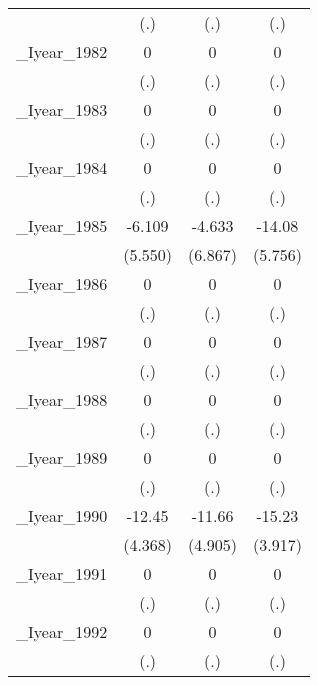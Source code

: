 \begin{table}[htbp]
\begin{tabular}{l*{3}{c}}
          &      (.)         &      (.)         &      (.)         \\
[1em]
\_Iyear\_1982&        0         &        0         &        0         \\
          &      (.)         &      (.)         &      (.)         \\
[1em]
\_Iyear\_1983&        0         &        0         &        0         \\
          &      (.)         &      (.)         &      (.)         \\
[1em]
\_Iyear\_1984&        0         &        0         &        0         \\
          &      (.)         &      (.)         &      (.)         \\
[1em]
\_Iyear\_1985&   -6.109         &   -4.633         &   -14.08\sym{**} \\
          &  (5.550)         &  (6.867)         &  (5.756)         \\
[1em]
\_Iyear\_1986&        0         &        0         &        0         \\
          &      (.)         &      (.)         &      (.)         \\
[1em]
\_Iyear\_1987&        0         &        0         &        0         \\
          &      (.)         &      (.)         &      (.)         \\
[1em]
\_Iyear\_1988&        0         &        0         &        0         \\
          &      (.)         &      (.)         &      (.)         \\
[1em]
\_Iyear\_1989&        0         &        0         &        0         \\
          &      (.)         &      (.)         &      (.)         \\
[1em]
\_Iyear\_1990&   -12.45\sym{***}&   -11.66\sym{**} &   -15.23\sym{***}\\
          &  (4.368)         &  (4.905)         &  (3.917)         \\
[1em]
\_Iyear\_1991&        0         &        0         &        0         \\
          &      (.)         &      (.)         &      (.)         \\
[1em]
\_Iyear\_1992&        0         &        0         &        0         \\
          &      (.)         &      (.)         &      (.)         \\

\end{tabular}
\end{table}

